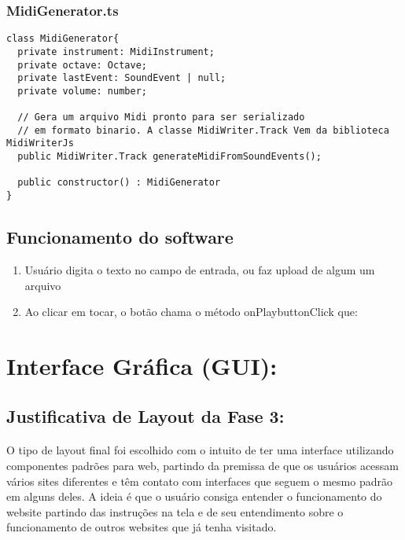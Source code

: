 \documentclass[12pt]{article}
\begin{document}
\subsubsection{MidiGenerator.ts}
\begin{verbatim}
class MidiGenerator{
  private instrument: MidiInstrument;
  private octave: Octave;
  private lastEvent: SoundEvent | null;
  private volume: number;
  
  // Gera um arquivo Midi pronto para ser serializado 
  // em formato binario. A classe MidiWriter.Track Vem da biblioteca MidiWriterJs
  public MidiWriter.Track generateMidiFromSoundEvents();
  
  public constructor() : MidiGenerator
}
\end{verbatim}


\subsection{Funcionamento do software}
\begin{enumerate}
\item {Usuário digita o texto no campo de entrada, ou faz upload de algum um arquivo}
\item {Ao clicar em tocar, o botão chama o método onPlaybuttonClick que:}
\end{enumerate}


\newpage
\section{Interface Gráfica (GUI):}

\subsection{Justificativa de Layout da Fase 3:}

\paragraph{}O tipo de layout final foi escolhido com o intuito de ter uma interface utilizando componentes padrões para web, partindo da premissa de que os usuários acessam vários sites diferentes e têm contato com interfaces que seguem o mesmo padrão em alguns deles. A ideia é que o usuário consiga entender o funcionamento do website partindo das instruções na tela e de seu entendimento sobre o funcionamento de outros websites que já tenha visitado.
\end{document}
